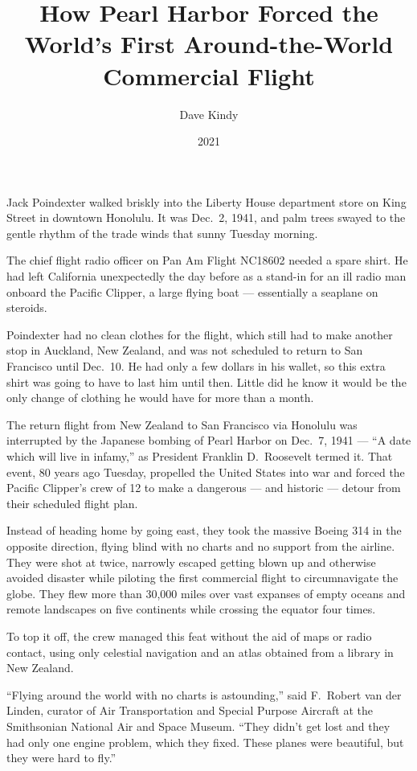 \documentclass[12pt]{article}
\title{How Pearl Harbor Forced the World’s First Around-the-World Commercial Flight}
\author{Dave Kindy}
\date{2021}
\begin{document}
\maketitle

Jack Poindexter walked briskly into the Liberty House department store on King Street in downtown Honolulu. It was Dec.~2, 1941, and palm trees swayed to the gentle rhythm of the trade winds that sunny Tuesday morning.

The chief flight radio officer on Pan Am Flight NC18602 needed a spare shirt. He had left California unexpectedly the day before as a stand-in for an ill radio man onboard the Pacific Clipper, a large flying boat --- essentially a seaplane on steroids.

Poindexter had no clean clothes for the flight, which still had to make another stop in Auckland, New Zealand, and was not scheduled to return to San Francisco until Dec.~10. He had only a few dollars in his wallet, so this extra shirt was going to have to last him until then. Little did he know it would be the only change of clothing he would have for more than a month.

The return flight from New Zealand to San Francisco via Honolulu was interrupted by the Japanese bombing of Pearl Harbor on Dec.~7, 1941 --- ``A date which will live in infamy,'' as President Franklin D.~Roosevelt termed it. That event, 80 years ago Tuesday, propelled the United States into war and forced the Pacific Clipper’s crew of 12 to make a dangerous --- and historic --- detour from their scheduled flight plan.

Instead of heading home by going east, they took the massive Boeing 314 in the opposite direction, flying blind with no charts and no support from the airline. They were shot at twice, narrowly escaped getting blown up and otherwise avoided disaster while piloting the first commercial flight to circumnavigate the globe. They flew more than 30,000 miles over vast expanses of empty oceans and remote landscapes on five continents while crossing the equator four times.

To top it off, the crew managed this feat without the aid of maps or radio contact, using only celestial navigation and an atlas obtained from a library in New Zealand.

``Flying around the world with no charts is astounding,'' said F.~Robert van der Linden, curator of Air Transportation and Special Purpose Aircraft at the Smithsonian National Air and Space Museum. ``They didn’t get lost and they had only one engine problem, which they fixed. These planes were beautiful, but they were hard to fly.''
\end{document}
